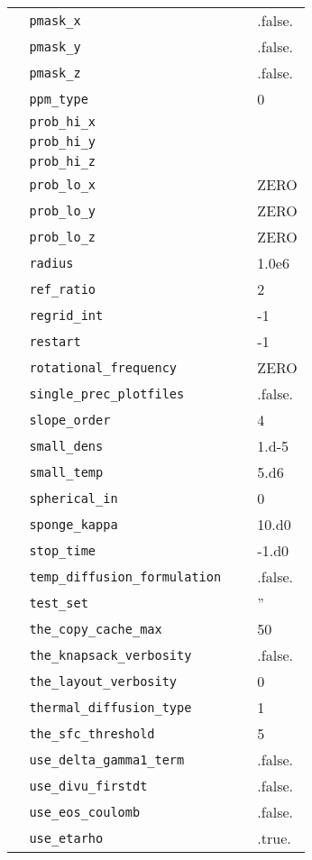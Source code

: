 {\begin{center}
\begin{longtable}{|l|p{3.25in}|l|}
\verb=  pmask_x =  &   &  .false. \\
\verb=  pmask_y =  &   &  .false. \\
\verb=  pmask_z =  &   &  .false. \\
\verb=  ppm_type =  &   &  0 \\
\verb=  prob_hi_x =  &   &  \\
\verb=  prob_hi_y =  &   &  \\
\verb=  prob_hi_z =  &   &  \\
\verb=  prob_lo_x =  &   &  ZERO \\
\verb=  prob_lo_y =  &   &  ZERO \\
\verb=  prob_lo_z =  &   &  ZERO \\
\verb=  radius =  &   &  1.0e6 \\
\verb=  ref_ratio =  &   &  2 \\
\verb=  regrid_int =  &   &  -1 \\
\verb=  restart =  &   & -1 \\
\verb=  rotational_frequency =  &   &  ZERO \\
\verb=  single_prec_plotfiles =  &   &  .false. \\
\verb=  slope_order =  &   &  4 \\
\verb=  small_dens =  &   &  1.d-5 \\
\verb=  small_temp =  &   &  5.d6 \\
\verb=  spherical_in =  &   &  0 \\
\verb=  sponge_kappa =  &   &  10.d0 \\
\verb=  stop_time =  &   &  -1.d0 \\
\verb=  temp_diffusion_formulation =  &   &  .false. \\
\verb=  test_set =  &   &  '' \\
\verb=  the_copy_cache_max =  &   & 50 \\
\verb=  the_knapsack_verbosity =  &   &  .false. \\
\verb=  the_layout_verbosity =  &   &  0 \\
\verb=  thermal_diffusion_type =  &   &  1 \\
\verb=  the_sfc_threshold =  &   & 5 \\
\verb=  use_delta_gamma1_term =  &   &  .false. \\
\verb=  use_divu_firstdt =  &   &  .false. \\
\verb=  use_eos_coulomb =  &   &  .false. \\
\verb=  use_etarho =  &   &  .true. \\

\end{longtable}
\end{center}}
